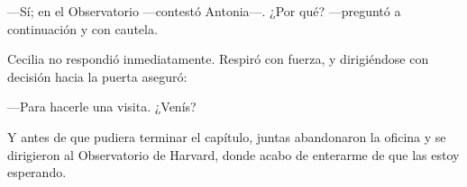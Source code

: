 ---Sí; en el Observatorio ---contestó Antonia---. ¿Por qué?
---pre\-gun\-tó a continuación y con cautela.

Cecilia no respondió inmediatamente. Respiró con fuerza, y
dirigiéndose con decisión hacia la puerta aseguró:

---Para hacerle una visita. ¿Venís?

Y antes de que pudiera terminar el capítulo, juntas abandonaron la
oficina y se dirigieron al Observatorio de Harvard, donde acabo de
enterarme de que las estoy esperando.



